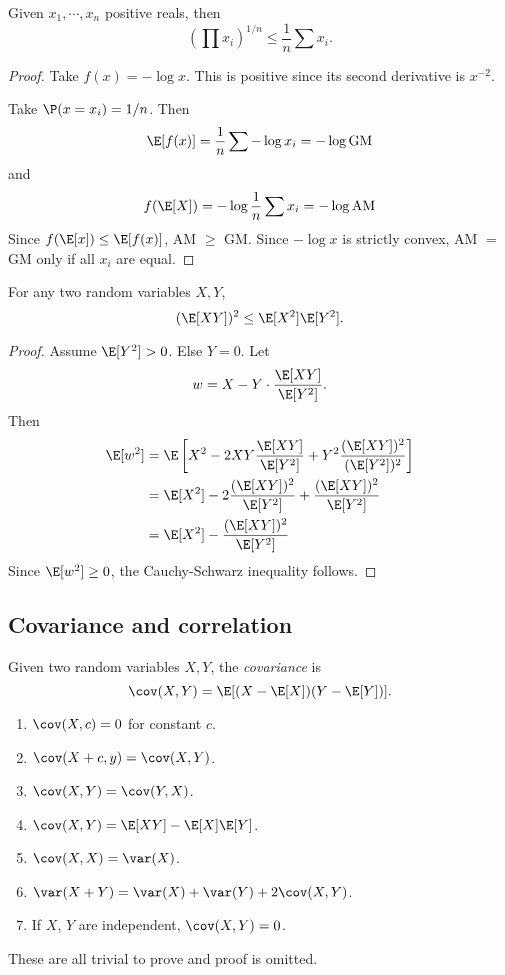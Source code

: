 \documentclass[a4paper]{article}
\begin{document}
\begin{cor}[AM-GM inequality]
  Given $x_1, \cdots, x_n$ positive reals, then
  \[
    \left(\prod x_i\right)^{1/n} \leq \frac{1}{n}\sum x_i.
  \]
\end{cor}

\begin{proof}
  Take $f(x) = -\log x$. This is positive since its second derivative is $x^{-2}$.

  Take $\P(x = x_i) = 1/n$. Then
  \[
    \E[f(x)] = \frac{1}{n}\sum -\log x_i = -\log \text{GM}
  \]
  and
  \[
    f(\E[X]) = -\log \frac{1}{n}\sum x_i = -\log\text{AM}
  \]
  Since $f(\E[x]) \leq \E[f(x)]$, AM $\geq$ GM. Since $-\log x$ is strictly convex, AM $=$ GM only if all $x_i$ are equal.
\end{proof}

\begin{thm}
  For any two random variables $X, Y$,
  \[
    (\E[XY])^2 \leq \E[X^2]\E[Y^2].
  \]
\end{thm}

\begin{proof}
  Assume $\E[Y^2] > 0$. Else $Y = 0$. Let
  \[
    w = X - Y\cdot \frac{\E[XY]}{\E[Y^2]}.
  \]
  Then
  \begin{align*}
    \E[w^2] &= \E\left[X^2 - 2XY\frac{\E[XY]}{\E[Y^2]} + Y^2\frac{(\E[XY])^2}{(\E[Y^2])^2}\right]\\
    &= \E[X^2] - 2\frac{(\E[XY])^2}{\E[Y^2]} + \frac{(\E[XY])^2}{\E[Y^2]}\\
    &= \E[X^2] - \frac{(\E[XY])^2}{\E[Y^2]}
  \end{align*}
  Since $\E[w^2] \geq 0$, the Cauchy-Schwarz inequality follows.
\end{proof}
\subsection{Covariance and correlation}
\begin{defi}[Covariance]
  Given two random variables $X, Y$, the \emph{covariance} is
  \[
    \cov(X, Y) = \E[(X - \E[X])(Y - \E[Y])].
  \]
\end{defi}

\begin{prop}\leavevmode
  \begin{enumerate}
    \item $\cov(X, c) = 0$ for constant $c$.
    \item $\cov(X + c, y) = \cov (X, Y)$.
    \item $\cov (X, Y) = \cov (Y, X)$.
    \item $\cov (X, Y) = \E[XY] - \E[X]\E[Y]$.
    \item $\cov (X, X) = \var (X)$.
    \item $\var (X + Y) = \var (X) + \var (Y) + 2\cov (X, Y)$.
    \item If $X$, $Y$ are independent, $\cov(X, Y) = 0$.
  \end{enumerate}
\end{prop}
These are all trivial to prove and proof is omitted.
\end{document}
